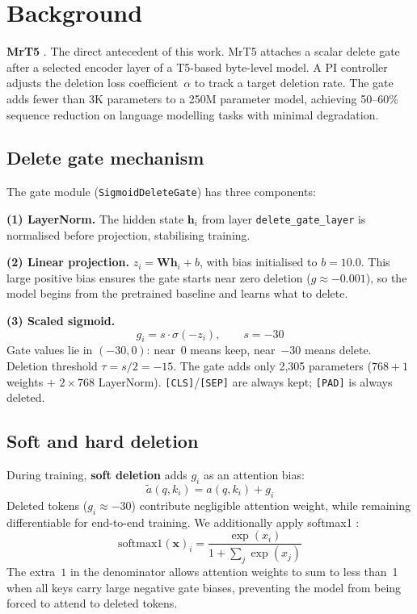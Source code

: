 \documentclass{article} %
\begin{document}
\section{Background}
\label{sec:background}

\textbf{MrT5} \citep{kallini2024mrt5}. The direct antecedent of this work. MrT5 attaches a scalar delete gate after a selected encoder layer of a T5-based byte-level model. A PI controller adjusts the deletion loss coefficient~$\alpha$ to track a target deletion rate. The gate adds fewer than 3K parameters to a 250M parameter model, achieving 50--60\% sequence reduction on language modelling tasks with minimal degradation.

\subsection{Delete gate mechanism}
\label{sec:delete-gate}

The gate module (\texttt{SigmoidDeleteGate}) has three components:

\textbf{(1) LayerNorm.} The hidden state $\mathbf{h}_i$ from layer \texttt{delete\_gate\_layer} is normalised before projection, stabilising training.

\textbf{(2) Linear projection.} $z_i = \mathbf{W}\mathbf{h}_i + b$, with bias initialised to $b=10.0$. This large positive bias ensures the gate starts near zero deletion ($g\approx-0.001$), so the model begins from the pretrained baseline and learns what to delete.

\textbf{(3) Scaled sigmoid.}
\begin{equation}
    g_i = s \cdot \sigma(-z_i), \qquad s = -30
    \label{eq:scaled-sigmoid}
\end{equation}
Gate values lie in $(-30,0)$: near~$0$ means keep, near~$-30$ means delete. Deletion threshold $\tau = s/2 = -15$. The gate adds only 2,305 parameters ($768+1$ weights $+$ $2{\times}768$ LayerNorm). \texttt{[CLS]}/\texttt{[SEP]} are always kept; \texttt{[PAD]} is always deleted.

\subsection{Soft and hard deletion}

During training, \textbf{soft deletion} adds $g_i$ as an attention bias:
\begin{equation}
    \tilde{a}(q, k_i) = a(q, k_i) + g_i
\end{equation}
Deleted tokens ($g_i\approx-30$) contribute negligible attention weight, while remaining differentiable for end-to-end training. We additionally apply softmax1 \citep{kallini2024mrt5}:
\begin{equation}
    \text{softmax1}(\mathbf{x})_i = \frac{\exp(x_i)}{1 + \sum_j \exp(x_j)}
    \label{eq:softmax1}
\end{equation}
The extra~$1$ in the denominator allows attention weights to sum to less than~1 when all keys carry large negative gate biases, preventing the model from being forced to attend to deleted tokens.
\end{document}
